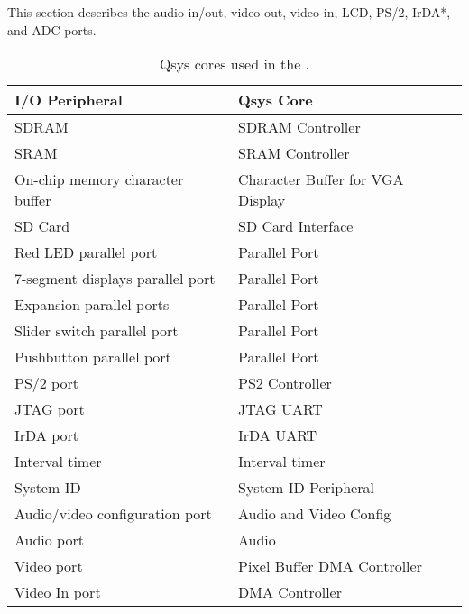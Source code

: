 This section describes the audio in/out, video-out, video-in, LCD, PS/2, IrDA*, and ADC ports.












\begin{table}[h]
    \begin{center}
    \begin{tabular}{l|l}
            \textbf{I/O Peripheral}
            & \textbf{Qsys Core}
        \\\hline
            SDRAM
            & SDRAM Controller
        \\
            SRAM
        &   SRAM Controller
        \\
            On-chip memory character buffer
				& Character Buffer for VGA Display
        \\
            SD Card
        &   SD Card Interface
        \\
            Red LED parallel port
				& Parallel Port
        \\
            7-segment displays parallel port
				& Parallel Port
        \\
            Expansion parallel ports
				& Parallel Port
        \\
            Slider switch parallel port
				& Parallel Port
        \\
            Pushbutton parallel port
				& Parallel Port
        \\
            PS/2 port
				& PS2 Controller
        \\
            JTAG port
				& JTAG UART
        \\
            IrDA port
				& IrDA UART
        \\
            Interval timer
				& Interval timer 
        \\
            System ID
				& System ID Peripheral
        \\
            Audio/video configuration port
				& Audio and Video Config
        \\
            Audio port
				& Audio
        \\
            Video port
				& Pixel Buffer DMA Controller
        \\
            Video In port
				& DMA Controller
        \\
    \end{tabular}
    \caption{Qsys cores used in the \systemName.}
    \label{tab:sopcnames}
    \end{center}
\end{table}

